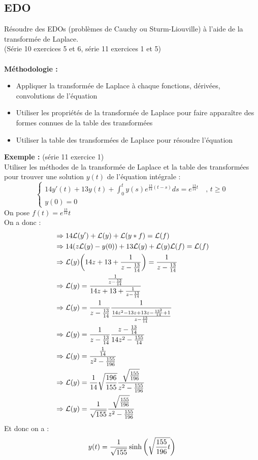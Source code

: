 \subsection{EDO}
Résoudre des EDOs (problèmes de Cauchy ou Sturm-Liouville) à l’aide de la transformée de Laplace. \\
(Série 10 exercices 5 et 6, série 11 exercices 1 et 5) \\
\\
\textbf{Méthodologie :}
\begin{itemize}
    \item Appliquer la transformée de Laplace à chaque fonctions, dérivées, convolutions de l'équation
    \item Utiliser les propriétés de la transformée de Laplace pour faire apparaître des formes connues de la table des transformées
    \item Utiliser la table des transformées de Laplace pour résoudre l'équation
\end{itemize}
\textbf{Exemple :} (série 11 exercice 1) \\
Utiliser les méthodes de la transformée de Laplace et la table  des transformées pour trouver une solution $y(t)$ de l'équation intégrale :
$$
\begin{cases}
    14y'(t) + 13y(t) + \int_{0}^{t} y(s) e^{\frac{13}{14}(t-s)} ds = e^{\frac{13}{14}t} \quad \text{, } t \geq 0 \\
    y(0) = 0
\end{cases}
$$
On pose $f(t) = e^\frac{13}{14}t$ \\
On a donc :
\begin{align*}
    &\Rightarrow 14 \mathcal{L}(y') + \mathcal{L}(y) + \mathcal{L}(y \ast f) = \mathcal{L}(f) \\
    &\Rightarrow 14(z \mathcal{L}(y) - y(0)) + 13 \mathcal{L}(y) + \mathcal{L}(y) \mathcal{L}(f) = \mathcal{L}(f) \\
    &\Rightarrow \mathcal{L}(y)\bigg{(}14z + 13 + \frac{1}{z - \frac{13}{14}}\bigg{)} = \frac{1}{z - \frac{13}{14}} \\
    &\Rightarrow \mathcal{L}(y) = \frac{\frac{1}{z-\frac{13}{14}}}{14z + 13 + \frac{1}{z - \frac{13}{14}}} \\
    &\Rightarrow \mathcal{L}(y) = \frac{1}{z-\frac{13}{14}} \frac{1}{\frac{14z^2 -13z +13z -\frac{13^2}{14} +1}{z-\frac{13}{14}}} \\
    &\Rightarrow \mathcal{L}(y) = \frac{1}{z-\frac{13}{14}} \frac{z-\frac{13}{14}}{14z^2 - \frac{155}{14}} \\
    &\Rightarrow \mathcal{L}(y) = \frac{\frac{1}{14}}{z^2 - \frac{155}{196}} \\
    &\Rightarrow \mathcal{L}(y) = \frac{1}{14} \sqrt{\frac{196}{155}} \frac{\sqrt{\frac{155}{196}}}{z^2 - \frac{155}{196}} \\
    &\Rightarrow \mathcal{L}(y) = \frac{1}{\sqrt{155}} \frac{\sqrt{\frac{155}{196}}}{z^2 - \frac{155}{196}}
\end{align*}
Et donc on a :
$$y(t) = \frac{1}{\sqrt{155}} \sinh \bigg{(} \sqrt{\frac{155}{196}t} \bigg{)}$$